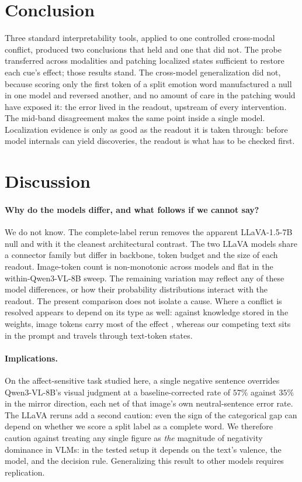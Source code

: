 \documentclass{article}
\newcommand{\qwen}{Qwen3-VL-8B}
\newcommand{\llava}{LLaVA-1.5-7B}
\begin{document}
\section{Conclusion}
\label{sec:conclusion}

Three standard interpretability tools, applied to one controlled cross-modal conflict, produced two conclusions that held and one that did not. The probe transferred across modalities and patching localized states sufficient to restore each cue's effect; those results stand. The cross-model generalization did not, because scoring only the first token of a split emotion word manufactured a null in one model and reversed another, and no amount of care in the patching would have exposed it: the error lived in the readout, upstream of every intervention. The mid-band disagreement makes the same point inside a single model. Localization evidence is only as good as the readout it is taken through: before model internals can yield discoveries, the readout is what has to be checked first.
\else
\section{Discussion}
\label{sec:discussion}

\paragraph{Why do the models differ, and what follows if we cannot say?}
We do not know. The complete-label rerun removes the apparent \llava{} null and with it the cleanest architectural contrast. The two LLaVA models share a connector family but differ in backbone, token budget and the size of each readout. Image-token count is non-monotonic across models and flat in the within-\qwen{} sweep. The remaining variation may reflect any of these model differences, or how their probability distributions interact with the readout. The present comparison does not isolate a cause. Where a conflict is resolved appears to depend on its type as well: against knowledge stored in the weights, image tokens carry most of the effect \citep{nooralahzadeh2026, lietzow2026}, whereas our competing text sits in the prompt and travels through text-token states.

\paragraph{Implications.}
On the affect-sensitive task studied here, a single negative sentence overrides \qwen{}'s visual judgment at a baseline-corrected rate of $57\%$ against $35\%$ in the mirror direction, each net of that image's own neutral-sentence error rate. The LLaVA reruns add a second caution: even the sign of the categorical gap can depend on whether we score a split label as a complete word. We therefore caution against treating any single figure as \emph{the} magnitude of negativity dominance in VLMs: in the tested setup it depends on the text's valence, the model, and the decision rule. Generalizing this result to other models requires replication.
\end{document}
